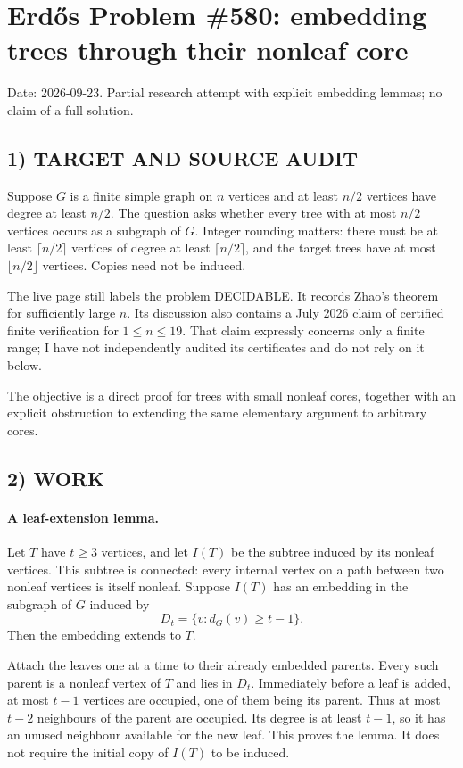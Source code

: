 \section{Erd\H{o}s Problem \#580: embedding trees through their nonleaf core}
\noindent Date: 2026-09-23. Partial research attempt with explicit embedding lemmas; no claim of a full solution.

\subsection{1) TARGET AND SOURCE AUDIT}
Suppose $G$ is a finite simple graph on $n$ vertices and at least $n/2$ vertices have degree at least $n/2$. The question asks whether every tree with at most $n/2$ vertices occurs as a subgraph of $G$. Integer rounding matters: there must be at least $\lceil n/2\rceil$ vertices of degree at least $\lceil n/2\rceil$, and the target trees have at most $\lfloor n/2\rfloor$ vertices. Copies need not be induced.

The live page still labels the problem DECIDABLE. It records Zhao's theorem for sufficiently large $n$. Its discussion also contains a July 2026 claim of certified finite verification for $1\le n\le19$. That claim expressly concerns only a finite range; I have not independently audited its certificates and do not rely on it below.

The objective is a direct proof for trees with small nonleaf cores, together with an explicit obstruction to extending the same elementary argument to arbitrary cores.

\subsection{2) WORK}
\paragraph{A leaf-extension lemma.}
Let $T$ have $t\ge3$ vertices, and let $I(T)$ be the subtree induced by its nonleaf vertices. This subtree is connected: every internal vertex on a path between two nonleaf vertices is itself nonleaf. Suppose $I(T)$ has an embedding in the subgraph of $G$ induced by
\[
D_t=\{v:d_G(v)\ge t-1\}.
\]
Then the embedding extends to $T$.

Attach the leaves one at a time to their already embedded parents. Every such parent is a nonleaf vertex of $T$ and lies in $D_t$. Immediately before a leaf is added, at most $t-1$ vertices are occupied, one of them being its parent. Thus at most $t-2$ neighbours of the parent are occupied. Its degree is at least $t-1$, so it has an unused neighbour available for the new leaf. This proves the lemma. It does not require the initial copy of $I(T)$ to be induced.

